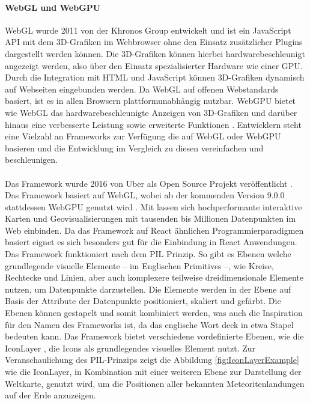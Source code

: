 \paragraph{WebGL und WebGPU}
\ac{WebGL} wurde 2011 von der Khronos Group entwickelt und ist ein JavaScript \ac{API} mit dem 3D-Grafiken im Webbrowser ohne den Einsatz zusätzlicher Plugins dargestellt werden können. Die 3D-Grafiken können hierbei hardwarebeschleunigt angezeigt werden, also über den Einsatz spezialisierter Hardware wie einer \ac{GPU}. Durch die Integration mit \ac{HTML} und JavaScript können 3D-Grafiken dynamisch auf Webseiten eingebunden werden. Da \ac{WebGL} auf offenen Webstandards basiert, ist es in allen Browsern plattformunabhängig nutzbar.\cite[S.~17-19]{Parisi2014} WebGPU bietet wie \ac{WebGL} das hardwarebeschleunigte Anzeigen von 3D-Grafiken und darüber hinaus eine verbesserte Leistung sowie erweiterte Funktionen \cite{Surma2022}. Entwicklern steht eine Vielzahl an Frameworks zur Verfügung die auf \ac{WebGL} oder WebGPU basieren \cite{Seguin2024} und die Entwicklung im Vergleich zu diesen vereinfachen und beschleunigen.

\paragraph{\deckgl{}}
Das Framework \deckgl{} wurde 2016 von Uber als Open Source Projekt veröffentlicht \cite{Visgl}. Das Framework basiert auf \ac{WebGL}, wobei ab der kommenden Version 9.0.0 stattdessen WebGPU genutzt wird \cite{Green2022}. Mit \deckgl{} lassen sich hochperformante interaktive Karten und Geovisualisierungen mit tausenden bis Millionen Datenpunkten im Web einbinden. Da das Framework auf React ähnlichen Programmierparadigmen basiert eignet es sich besonders gut für die Einbindung in React Anwendungen. Das Framework funktioniert nach dem \ac{PIL} Prinzip. So gibt es Ebenen welche grundlegende visuelle Elemente – im Englischen Primitives –, wie Kreise, Rechtecke und Linien, aber auch komplexere teilweise dreidimensionale Elemente nutzen, um Datenpunkte darzustellen. Die Elemente werden in der Ebene auf Basis der Attribute der Datenpunkte positioniert, skaliert und gefärbt. Die Ebenen können gestapelt und somit kombiniert werden, was auch die Inspiration für den Namen des Frameworks ist, da das englische Wort deck in etwa Stapel bedeuten kann.\cite[S.~2]{YangWang2019} Das Framework bietet verschiedene vordefinierte Ebenen, wie die IconLayer \cite{DeckglIconLayer}, die Icons als grundlegendes visuelles Element nutzt. Zur Veranschaulichung des \ac{PIL}-Prinzips zeigt die Abbildung \ref{fig:IconLayerExample} wie die IconLayer, in Kombination mit einer weiteren Ebene zur Darstellung der Weltkarte, genutzt wird, um die Positionen aller bekannten Meteoritenlandungen auf der Erde anzuzeigen.

